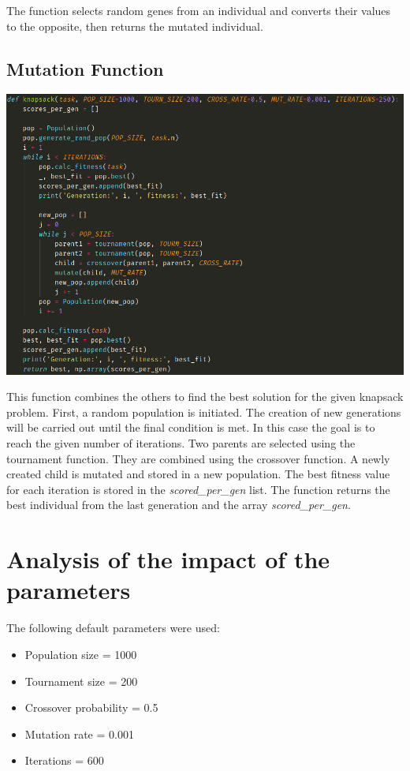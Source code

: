 \documentclass[12pt]{article}
\begin{document}
The function selects random genes from an individual and converts their values to the opposite, then returns the mutated individual.

\subsection{Mutation Function}
\begin{center}
	\includegraphics[scale=0.5]{knapsack}
\end{center}

This function combines the others to find the best solution for the given knapsack problem. First, a random population is initiated. 
The creation of new generations will be carried out until the final condition is met. In this case the goal is to reach the given number of iterations. Two parents are selected using the tournament function. They are combined using the crossover function. A newly created child is mutated and stored in a new population. The best fitness value for each iteration is stored in the \emph{scored\_per\_gen} list. The function returns the best individual from the last generation and the array \emph{scored\_per\_gen}.

\section{Analysis of the impact of the parameters}
The following default parameters were used: 
\begin{itemize}
\item Population size = 1000
\item Tournament size = 200
\item Crossover probability = 0.5
\item Mutation rate = 0.001
\item Iterations = 600
\end{itemize}
\end{document}
